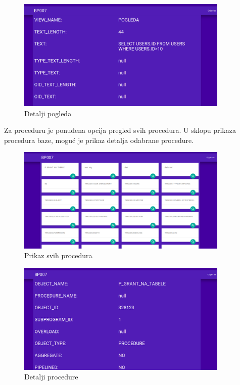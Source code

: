 \documentclass[12pt, a4paper]{report}
\theoremstyle{definition}
\begin{document}
\begin{figure}[H]
	\begin{center} 
		\includegraphics[width=0.9\textwidth]{a14.png}
	\end{center}
	\caption{Detalji pogleda}
\end{figure}

\newpage
Za proceduru je ponuđena opcija pregled svih procedura.
U sklopu prikaza procedura baze, moguć je prikaz detalja odabrane procedure.
\begin{figure}[H]
	\begin{center} 
		\includegraphics[width=0.9\textwidth]{a11.png}
	\end{center}
	\caption{Prikaz svih procedura}
\end{figure}

\begin{figure}[H]
	\begin{center} 
		\includegraphics[width=0.9\textwidth]{a12.png}
	\end{center}
	\caption{Detalji procedure}
\end{figure}
\end{document}
